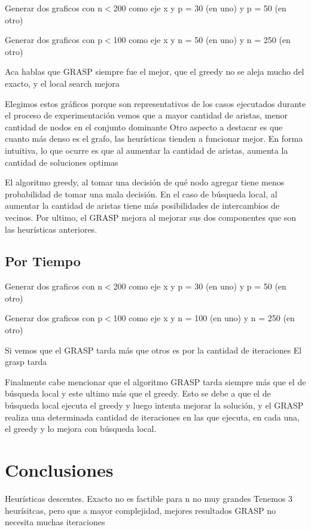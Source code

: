 Generar dos graficos con n$<$200 como eje x y p = 30 (en uno) y p = 50 (en otro)


Generar dos graficos con p$<$100 como eje x y n = 50 (en uno) y n = 250 (en otro)


Aca hablas que GRASP siempre fue el mejor, que el greedy no se aleja mucho del exacto, y el local search mejora 

Elegimos estos gráficos porque son representativos de los casos ejecutados durante el proceso de experimentación
vemos que a mayor cantidad de aristas, menor cantidad de nodos en el conjunto dominante
Otro aspecto a destacar es que cuanto más denso es el grafo, las heurísticas tienden a funcionar mejor.
En forma intuitiva, lo que ocurre es que al aumentar la cantidad de
aristas, aumenta la cantidad de soluciones optimas

El algoritmo greedy, al tomar una decisión de qué nodo agregar tiene menos probabilidad de tomar una mala decisión. 
En el caso de búsqueda local, al aumentar la cantidad de aristas tiene más posibilidades de intercambios de vecinos. Por ultimo, el
GRASP mejora al mejorar sus dos componentes que son las heurísticas anteriores.




\subsection{Por Tiempo}

Generar dos graficos con n$<$200 como eje x y p = 30 (en uno) y p = 50 (en otro)

Generar dos graficos con p$<$100 como eje x y n = 100 (en uno) y n = 250 (en otro)


Si vemos que el GRASP tarda más que otros es por la cantidad de iteraciones
El grasp tarda 

Finalmente cabe mencionar que el algoritmo GRASP tarda siempre más que el de búsqueda local y este ultimo más que el
greedy. Esto se debe a que el de búsqueda local ejecuta el greedy y luego intenta mejorar la solución, y el GRASP realiza una
determinada cantidad de iteraciones en las que ejecuta, en cada una, el greedy y lo mejora con búsqueda local.




\section{Conclusiones}
Heurísticas descentes. Exacto no es factible para n no muy grandes
Tenemos 3 heurísitcas, pero que a mayor complejidad, mejores resultados
GRASP no necesita muchas iteraciones


